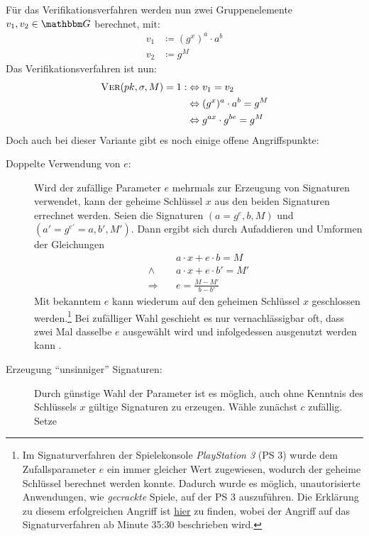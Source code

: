 Für das Verifikationsverfahren werden nun zwei Gruppenelemente $v_1, v_2
\in \G$ berechnet, mit:
\begin{align*} 
  v_1 &\coloneqq (g^x)^a \cdot a^b\\ v_2 &\coloneqq g^M
\end{align*}
Das Verifikationsverfahren ist nun:
\begin{align*} 
  \textsc{Ver}(pk,\sigma,M) = 1 : & \Leftrightarrow v_1 = v_2 \\
                             &\Leftrightarrow (g^x)^a \cdot a^b = g^M \\ 
                             &\Leftrightarrow g^{ax}\cdot g^{be} = g^M
\end{align*} 
Doch auch bei dieser Variante gibt es noch einige offene
Angriffspunkte:
\begin{description}
\item[Doppelte Verwendung von $e$:] Wird der zufällige Parameter
  $e$ mehrmals zur Erzeugung von Signaturen verwendet, kann der geheime
  Schlüssel $x$ aus den beiden Signaturen errechnet werden. Seien die
  Signaturen $(a = g^e, b, M)$ und $(a' = g^{e'} = a, b', M')$. Dann
  ergibt sich durch Aufaddieren und Umformen der Gleichungen
  \begin{align*} &a \cdot x + e \cdot b = M\\ \land \quad &a \cdot
                                                            x + e \cdot b' = M'\\ \Rightarrow \quad &e = \frac{M - M'}{b - b'}
  \end{align*} Mit bekanntem $e$ kann wiederum auf den geheimen
  Schlüssel $x$ geschlossen werden.\footnote{Im Signaturverfahren der
    Spielekonsole \textit{PlayStation 3} (PS 3) wurde dem Zufallsparameter
    $e$ ein immer gleicher Wert zugewiesen, wodurch der geheime Schlüssel
    berechnet werden konnte. Dadurch wurde es möglich, unautorisierte
    Anwendungen, wie \textit{gecrackte} Spiele, auf der PS 3
    auszuführen. Die Erklärung zu diesem erfolgreichen Angriff ist
    \href{https://www.youtube.com/watch?v=4loZGYqaZ7I}{hier} zu finden,
    wobei der Angriff auf das Signaturverfahren ab Minute 35:30 beschrieben
    wird.} Bei zufälliger Wahl geschieht es nur vernachlässigbar oft, dass
  zwei Mal dasselbe $e$ ausgewählt wird und infolgedessen ausgenutzt
  werden kann .
\item[Erzeugung "`unsinniger"' Signaturen:] Durch günstige Wahl
  der Parameter ist es möglich, auch ohne Kenntnis des Schlüssels $x$
  gültige Signaturen zu erzeugen. Wähle zunächst $c$ zufällig. Setze

\end{description}
